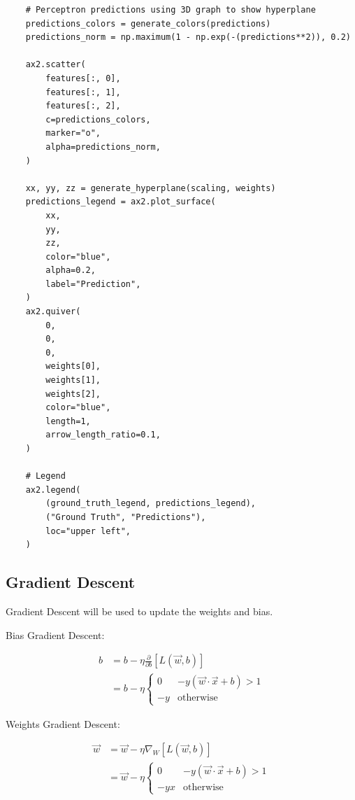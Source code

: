 \documentclass[openany]{book}
\begin{document}
\begin{tcolorbox}
\begin{verbatim}
    # Perceptron predictions using 3D graph to show hyperplane
    predictions_colors = generate_colors(predictions)
    predictions_norm = np.maximum(1 - np.exp(-(predictions**2)), 0.2)

    ax2.scatter(
        features[:, 0],
        features[:, 1],
        features[:, 2],
        c=predictions_colors,
        marker="o",
        alpha=predictions_norm,
    )

    xx, yy, zz = generate_hyperplane(scaling, weights)
    predictions_legend = ax2.plot_surface(
        xx,
        yy,
        zz,
        color="blue",
        alpha=0.2,
        label="Prediction",
    )
    ax2.quiver(
        0,
        0,
        0,
        weights[0],
        weights[1],
        weights[2],
        color="blue",
        length=1,
        arrow_length_ratio=0.1,
    )

    # Legend
    ax2.legend(
        (ground_truth_legend, predictions_legend),
        ("Ground Truth", "Predictions"),
        loc="upper left",
    )
\end{verbatim}
\end{tcolorbox}

    \subsection{Gradient Descent}\label{gradient-descent}

Gradient Descent will be used to update the weights and bias.

    Bias Gradient Descent:

\begin{align*}
b &= b - \eta \frac{\partial}{\partial b} [L(\vec{w}, b)] \\
&= b - \eta \begin{cases}
0 & -y(\vec{w} \cdot \vec{x} + b) > 1 \\
-y & \text{otherwise}
\end{cases}
\end{align*}

    Weights Gradient Descent:

\begin{align*}
\vec{w} &= \vec{w} - \eta \nabla_{W} [L(\vec{w}, b)] \\
&= \vec{w} - \eta \begin{cases}
0 & -y(\vec{w} \cdot \vec{x} + b) > 1 \\
-y x & \text{otherwise}
\end{cases}
\end{align*}
\end{document}
